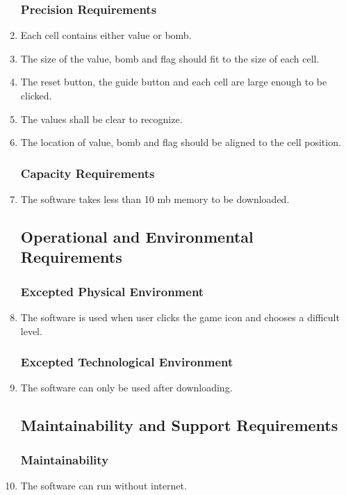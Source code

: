 \documentclass[10pt]{article}
\begin{document}
\begin{enumerate}
\subsubsection{Precision Requirements}

\item Each cell contains either value or bomb.
\item The size of the value, bomb and flag should fit to the size of each cell.
\item The reset button, the guide button and each cell are large enough to be clicked.
\item The values shall be clear to recognize.
\item The location of value, bomb and flag should be aligned to the cell position.

\subsubsection{Capacity Requirements}

\item The software takes less than 10 mb memory to be downloaded.

\subsection{Operational and Environmental Requirements}
\subsubsection{Excepted Physical Environment}
\item The software is used when user clicks the game icon and chooses a difficult level.
\subsubsection{Excepted Technological Environment}
\item The software can only be used after downloading.
\subsection{Maintainability and Support Requirements}
\subsubsection{Maintainability}

\item The software can run without internet.


\end{enumerate}
\end{document}
